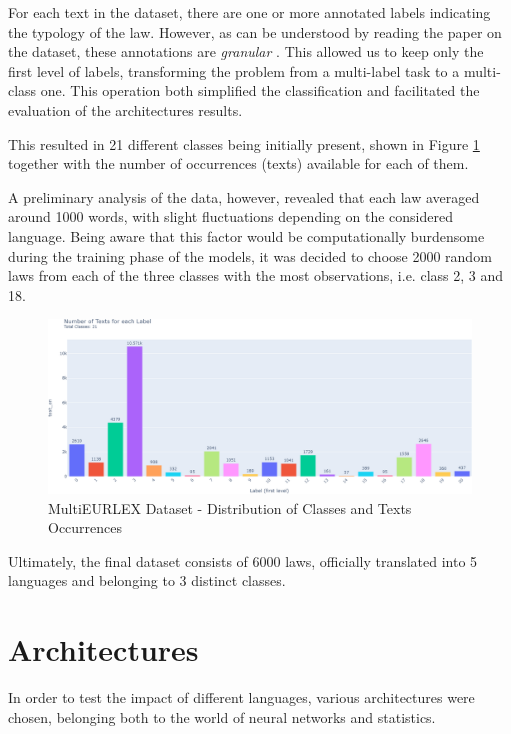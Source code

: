 \documentclass[letterpaper,11pt]{article}
\begin{document}
For each text in the dataset, there are one or more annotated labels indicating the typology of the law. However, as can be understood by reading the paper on the dataset, these annotations are \textit{granular} \cite{Chalkidis2021MultiEURLEXA}. This allowed us to keep only the first level of labels, transforming the problem from a multi-label task to a multi-class one. This operation both simplified the classification and facilitated the evaluation of the architectures results.

This resulted in 21 different classes being initially present, shown in Figure \ref{fig:original_classes} together with the number of occurrences (texts) available for each of them.

A preliminary analysis of the data, however, revealed that each law averaged around 1000 words, with slight fluctuations depending on the considered language. Being aware that this factor would be computationally burdensome during the training phase of the models, it was decided to choose 2000 random laws from each of the three classes with the most observations, i.e. class 2, 3 and 18.

\begin{figure}[H]
  \centering
  \includegraphics[width=\textwidth]{data_original_classes.png}
  \caption{MultiEURLEX Dataset - Distribution of Classes and Texts Occurrences}
  \label{fig:original_classes}
\end{figure}



Ultimately, the final dataset consists of 6000 laws, officially translated into 5 languages and belonging to 3 distinct classes.

\section{Architectures}
\label{sec:architectures}

In order to test the impact of different languages, various architectures were chosen, belonging both to the world of neural networks and statistics.
\end{document}
